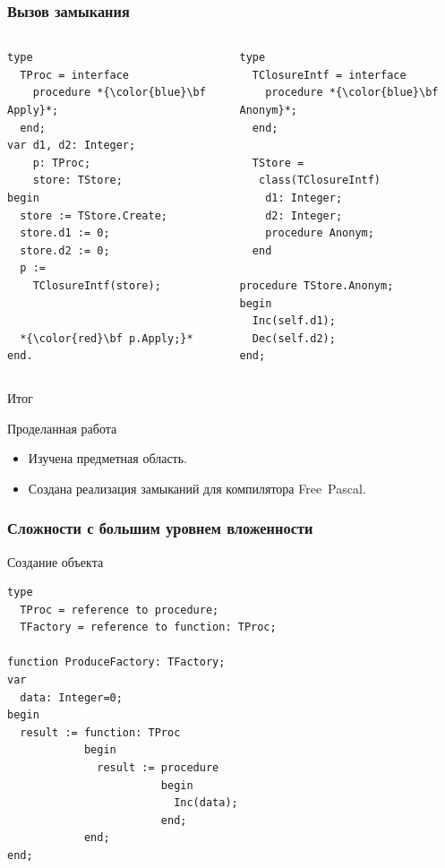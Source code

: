 \documentclass[roman,12pt]{beamer}
\begin{document}
\begin{frame}[fragile]
  \frametitle{Вызов замыкания}
  \begin{columns}[c]
    \column{2.2in}
     \begin{lstlisting}[escapechar=*,basicstyle=\footnotesize]
type 
  TProc = interface
    procedure *{\color{blue}\bf Apply}*;
  end;
var d1, d2: Integer;
    p: TProc;
    store: TStore;
begin
  store := TStore.Create;
  store.d1 := 0;
  store.d2 := 0;
  p :=
    TClosureIntf(store);
 

  *{\color{red}\bf p.Apply;}*
end.

     \end{lstlisting}
   \column{2.2in}
     \begin{lstlisting}[escapechar=*,basicstyle=\footnotesize]  
type
  TClosureIntf = interface
    procedure *{\color{blue}\bf Anonym}*;
  end;

  TStore =
   class(TClosureIntf)
    d1: Integer;
    d2: Integer;
    procedure Anonym;
  end
  
procedure TStore.Anonym;
begin
  Inc(self.d1);
  Dec(self.d2);
end;

     \end{lstlisting}

  \end{columns}
\end{frame}

\begin{frame}{Итог}
   \begin{block}{Проделанная работа}
     \begin{itemize}
     \item Изучена предметная область.
     \item Создана реализация замыканий для компилятора Free~Pascal.
     \end{itemize}
   \end{block} 
\end{frame}

\begin{frame}[fragile]
  \frametitle{Сложности с большим уровнем вложенности}
 \begin{block}{Создание объекта}
   \begin{lstlisting}
type
  TProc = reference to procedure;
  TFactory = reference to function: TProc;
  
function ProduceFactory: TFactory;
var
  data: Integer=0;
begin
  result := function: TProc
            begin
              result := procedure
                        begin
                          Inc(data);
                        end;
            end;
end;
   \end{lstlisting}
 \end{block} 
\end{frame}
\end{document}
